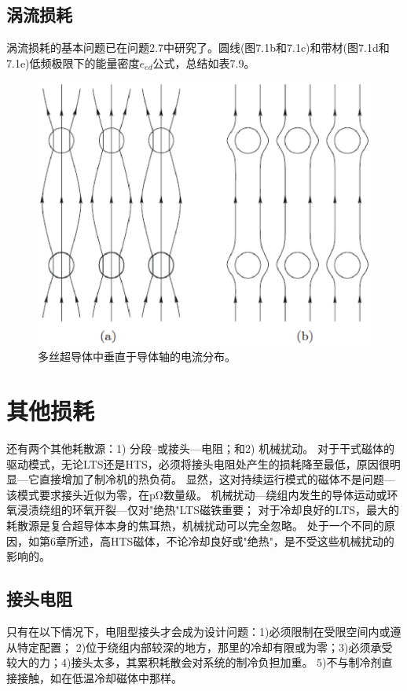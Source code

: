 \subsection{涡流损耗}
涡流损耗的基本问题已在问题2.7中研究了。圆线(图7.1b和7.1c)和带材(图7.1d和7.1e)低频极限下的能量密度$e_{ed}$公式，总结如表7.9。
\begin{figure}[htbp]
	\centering
	\includegraphics[scale=0.6]{chpt7/figs/fig7.6.eps}
	\caption{多丝超导体中垂直于导体轴的电流分布。}
\end{figure}

\section{其他损耗}
还有两个其他耗散源：1) 分段--或接头---电阻；和2) 机械扰动。
对于干式磁体的驱动模式，无论LTS还是HTS，必须将接头电阻处产生的损耗降至最低，原因很明显---它直接增加了制冷机的热负荷。
显然，这对持续运行模式的磁体不是问题---该模式要求接头近似为零，在$\mathrm{p\Omega}$数量级。
机械扰动---绕组内发生的导体运动或环氧浸渍绕组的环氧开裂---仅对"绝热"LTS磁铁重要；
对于冷却良好的LTS，最大的耗散源是复合超导体本身的焦耳热，机械扰动可以完全忽略。
处于一个不同的原因，如第6章所述，高HTS磁体，不论冷却良好或"绝热"，是不受这些机械扰动的影响的。
\subsection{接头电阻}
只有在以下情况下，电阻型接头才会成为设计问题：1)必须限制在受限空间内或遵从特定配置；
2)位于绕组内部较深的地方，那里的冷却有限或为零；3)必须承受较大的力；4)接头太多，其累积耗散会对系统的制冷负担加重。
5)不与制冷剂直接接触，如在低温冷却磁体中那样。

